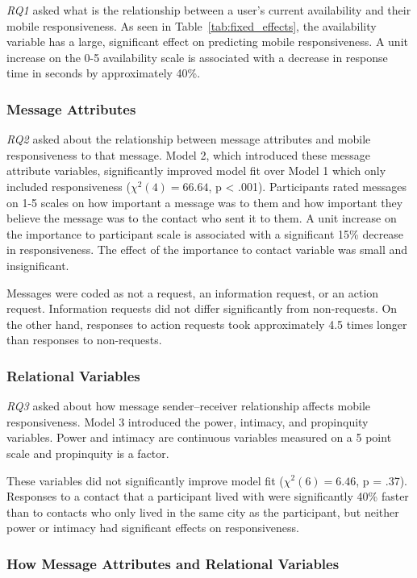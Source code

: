 \documentclass[12pt]{nuthesis}	%
\begin{document}
\textit{RQ1} asked what is the relationship between a user's current availability and their mobile responsiveness. As seen in Table~\ref{tab:fixed_effects}, the availability variable has a large, significant effect on predicting mobile responsiveness.  A unit increase on the 0-5 availability scale is associated with a decrease in response time in seconds by approximately 40\%.

\subsubsection{Message Attributes}

\textit{RQ2} asked about the relationship between message attributes and mobile responsiveness to that message. Model 2, which introduced these message attribute variables, significantly improved model fit over Model 1 which only included responsiveness ($\chi^2(4) = 66.64$, p < .001). Participants rated messages on 1-5 scales on how important a message was to them and how important they believe the message was to the contact who sent it to them. A unit increase on the importance to participant scale is associated with a significant 15\% decrease in responsiveness. The effect of the importance to contact variable was small and insignificant.

Messages were coded as not a request, an information request, or an action request. Information requests did not differ significantly from non-requests. On the other hand, responses to action requests took approximately 4.5 times longer than responses to non-requests.


\subsubsection{Relational Variables}

\textit{RQ3} asked about how message sender--receiver relationship affects mobile responsiveness. Model 3 introduced the power, intimacy, and propinquity variables. Power and intimacy are continuous variables measured on a 5 point scale and propinquity is a factor.

These variables did not significantly improve model fit ($\chi^2(6) = 6.46$, p = .37). Responses to a contact that a participant lived with were significantly 40\% faster than to contacts who only lived in the same city as the participant, but neither power or intimacy had significant effects on responsiveness.

\subsubsection{How Message Attributes and Relational Variables}
\end{document}

